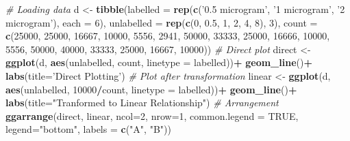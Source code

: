 \documentclass[
]{article}
\newenvironment{Shaded}{\begin{snugshade}}{\end{snugshade}}
\newcommand{\CommentTok}[1]{\textcolor[rgb]{0.56,0.35,0.01}{\textit{#1}}}
\newcommand{\DataTypeTok}[1]{\textcolor[rgb]{0.13,0.29,0.53}{#1}}
\newcommand{\DecValTok}[1]{\textcolor[rgb]{0.00,0.00,0.81}{#1}}
\newcommand{\FloatTok}[1]{\textcolor[rgb]{0.00,0.00,0.81}{#1}}
\newcommand{\KeywordTok}[1]{\textcolor[rgb]{0.13,0.29,0.53}{\textbf{#1}}}
\newcommand{\NormalTok}[1]{#1}
\newcommand{\OperatorTok}[1]{\textcolor[rgb]{0.81,0.36,0.00}{\textbf{#1}}}
\newcommand{\OtherTok}[1]{\textcolor[rgb]{0.56,0.35,0.01}{#1}}
\newcommand{\StringTok}[1]{\textcolor[rgb]{0.31,0.60,0.02}{#1}}
\begin{document}
\begin{Shaded}
\begin{Highlighting}[]
\CommentTok{# Loading data}
\NormalTok{d <-}\StringTok{ }\KeywordTok{tibble}\NormalTok{(}\DataTypeTok{labelled =} \KeywordTok{rep}\NormalTok{(}\KeywordTok{c}\NormalTok{(}\StringTok{'0.5 microgram'}\NormalTok{, }\StringTok{'1 microgram'}\NormalTok{, }\StringTok{'2 microgram'}\NormalTok{), }\DataTypeTok{each =} \DecValTok{6}\NormalTok{),}
       \DataTypeTok{unlabelled =} \KeywordTok{rep}\NormalTok{(}\KeywordTok{c}\NormalTok{(}\DecValTok{0}\NormalTok{, }\FloatTok{0.5}\NormalTok{, }\DecValTok{1}\NormalTok{, }\DecValTok{2}\NormalTok{, }\DecValTok{4}\NormalTok{, }\DecValTok{8}\NormalTok{), }\DecValTok{3}\NormalTok{),}
       \DataTypeTok{count =} \KeywordTok{c}\NormalTok{(}\DecValTok{25000}\NormalTok{, }\DecValTok{25000}\NormalTok{, }\DecValTok{16667}\NormalTok{, }\DecValTok{10000}\NormalTok{, }\DecValTok{5556}\NormalTok{, }\DecValTok{2941}\NormalTok{,}
                 \DecValTok{50000}\NormalTok{, }\DecValTok{33333}\NormalTok{, }\DecValTok{25000}\NormalTok{, }\DecValTok{16666}\NormalTok{, }\DecValTok{10000}\NormalTok{, }\DecValTok{5556}\NormalTok{,}
                 \DecValTok{50000}\NormalTok{, }\DecValTok{40000}\NormalTok{, }\DecValTok{33333}\NormalTok{, }\DecValTok{25000}\NormalTok{, }\DecValTok{16667}\NormalTok{, }\DecValTok{10000}\NormalTok{))}
\CommentTok{# Direct plot}
\NormalTok{direct <-}\StringTok{ }\KeywordTok{ggplot}\NormalTok{(d, }\KeywordTok{aes}\NormalTok{(unlabelled, count, }\DataTypeTok{linetype =}\NormalTok{ labelled))}\OperatorTok{+}
\StringTok{  }\KeywordTok{geom_line}\NormalTok{()}\OperatorTok{+}
\StringTok{  }\KeywordTok{labs}\NormalTok{(}\DataTypeTok{title=}\StringTok{'Direct Plotting'}\NormalTok{)}
\CommentTok{# Plot after transformation}
\NormalTok{linear <-}\StringTok{ }\KeywordTok{ggplot}\NormalTok{(d, }\KeywordTok{aes}\NormalTok{(unlabelled, }\DecValTok{10000}\OperatorTok{/}\NormalTok{count, }\DataTypeTok{linetype =}\NormalTok{ labelled))}\OperatorTok{+}
\StringTok{  }\KeywordTok{geom_line}\NormalTok{()}\OperatorTok{+}
\StringTok{  }\KeywordTok{labs}\NormalTok{(}\DataTypeTok{title=}\StringTok{"Tranformed to Linear Relationship"}\NormalTok{)}
\CommentTok{# Arrangement}
\KeywordTok{ggarrange}\NormalTok{(direct, linear, }\DataTypeTok{ncol=}\DecValTok{2}\NormalTok{, }\DataTypeTok{nrow=}\DecValTok{1}\NormalTok{, }\DataTypeTok{common.legend =} \OtherTok{TRUE}\NormalTok{, }\DataTypeTok{legend=}\StringTok{"bottom"}\NormalTok{, }\DataTypeTok{labels =} \KeywordTok{c}\NormalTok{(}\StringTok{"A"}\NormalTok{, }\StringTok{"B"}\NormalTok{))}
\end{Highlighting}
\end{Shaded}
\end{document}
